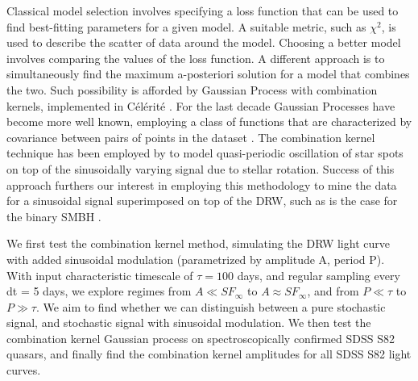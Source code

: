 \documentclass[modern]{aastex62}
\begin{document}
Classical model selection involves specifying a loss function that can be used to find best-fitting parameters for a given model. A suitable metric, such as $\chi^{2}$, is used to  describe the scatter of data around the model. Choosing a better model involves comparing the values of the loss function. A different approach is to simultaneously find the maximum a-posteriori solution for a model that combines the two. Such possibility is afforded by Gaussian Process with combination kernels,  implemented in C\'el\'erit\'e  \citep{foreman2017}. For the last decade Gaussian Processes have become more well known, employing a class of functions that  are characterized by covariance between pairs of points in the dataset \citep{foreman2017}.  The combination kernel technique has been employed by  \cite{angus2018}  to model  quasi-periodic oscillation of star spots on top of the sinusoidally varying signal due to stellar rotation. Success of this approach furthers our interest in employing this methodology to mine the data for a sinusoidal signal superimposed on top of the DRW, such as is the case for the binary SMBH \citep{charisi2018}. 

We first test the combination kernel method, simulating the DRW light curve with added sinusoidal modulation (parametrized by amplitude A, period P). With input characteristic timescale of $\tau  = 100 $ days, and regular sampling every dt = 5 days, we explore regimes from $A \ll SF_{\infty}$ to $A \approx SF_{\infty}$, and from $P \ll \tau$ to $P \gg \tau$. We aim to find whether we can distinguish between a pure stochastic signal, and stochastic signal with sinusoidal modulation. We then test the combination kernel Gaussian process on spectroscopically confirmed SDSS S82 quasars, and finally find  the combination kernel amplitudes for all SDSS S82 light curves.
\end{document}
